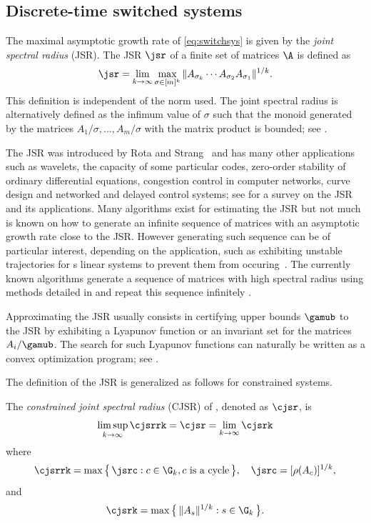 \documentclass[11pt,twoside,a4paper,openright]{uclouvain-thesis}
\begin{document}
\subsection{Discrete-time switched systems}
\label{sec:sosswitch}


The maximal asymptotic growth rate of \eqref{eq:switchsys} is given by the \emph{joint spectral radius} (JSR).
The JSR $\jsr$ of a finite set of matrices $\A$
is defined as
\[ \jsr = \lim_{k \to \infty} \max_{\sigma \in [m]^k} \|A_{\sigma_k} \cdots A_{\sigma_2} A_{\sigma_1}\|^{1/k}. \]
This definition is independent of the norm used.
The joint spectral radius is alternatively defined as the infimum value of $\sigma$ such that the monoid generated by the
matrices $A_1 / \sigma, \ldots, A_m / \sigma$ with the matrix product is bounded; see .

The JSR was introduced by Rota and Strang~\cite{rota1960note}
and has many other applications such as wavelets, the capacity of some particular codes, zero-order stability of ordinary differential equations, congestion control in computer networks, curve design and networked and delayed control systems; see \cite{jungers2009joint} for a survey on the JSR and its applications.
Many algorithms exist for estimating the JSR but not much is known on how to generate an infinite
sequence of matrices with an asymptotic growth rate close to the JSR.
However generating such sequence can be of particular interest, depending on the application,
such as exhibiting unstable trajectories for s\witch{} linear systems to prevent them from occuring~\cite{gomes2018minimally}. %
The currently known algorithms generate a sequence of matrices with high spectral radius
using methods detailed in 
and repeat this sequence infinitely \cite{gripenberg1996computing,guglielmi2008algorithm,guglielmi2013exact,jungers2014lifted}.

Approximating the JSR usually consists in certifying upper bounds $\gamub$ to the JSR by exhibiting a Lyapunov function or an invariant set for the matrices $A_i/\gamub$.
The search for such Lyapunov functions can naturally be written as a convex optimization program; see .

The definition of the JSR is generalized as follows for constrained systems.
\begin{mydef}
  \label{def:cjsr}
  The \emph{constrained joint spectral radius} (CJSR) of
  , denoted as $\cjsr$,
  is
  \begin{equation}
    \label{eq:jsrtheo}
    \limsup_{k \to \infty} \cjsrrk = \cjsr = \lim_{k \to \infty} \cjsrk
  \end{equation}
  where
  \begin{equation}
    \label{eq:cjsrrk}
    \cjsrrk
    = \max \big\{\, \jsrc : c \in \G_k, c \text{ is a cycle}\,\big\}, \quad \jsrc = [\rho(A_c)]^{1/k},
  \end{equation}
  and
  \begin{equation}
    \label{eq:cjsrk}
    \cjsrk =
    \max \big\{\, \|A_s\|^{1/k}\\: s \in \G_k \,\big\}.
  \end{equation}
\end{mydef}
\end{document}
